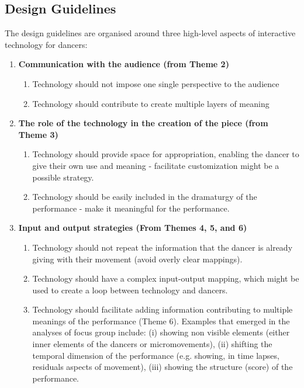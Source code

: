 \subsection{Design Guidelines}

The design guidelines are organised around three high-level aspects of interactive technology for dancers:

\renewcommand{\labelitemi}{$\alph$}
\renewcommand{\labelitemii}{$\alph$}
\begin{enumerate}

\item \textbf{Communication with the audience  (from Theme 2)}
\begin{enumerate}
\item Technology should not impose one single perspective to the audience
\item Technology should contribute to create multiple layers of meaning
\end{enumerate}

\item \textbf{The role of the technology in the creation of the piece (from Theme 3)}
\begin{enumerate}
\item Technology should provide space for appropriation, enabling the dancer to give their own use and meaning - facilitate customization might be a possible strategy.
\item Technology should be easily included in the dramaturgy of the performance - make it meaningful for the
performance.
\end{enumerate}

\item \textbf{Input and output strategies (From Themes 4, 5, and 6)}
\begin{enumerate}
\item Technology should not repeat the information that the dancer is already giving with their movement (avoid overly clear mappings).
\item Technology should have a complex input-output mapping, which might be used to create a loop between technology and dancers.
\item Technology should facilitate adding information contributing to multiple meanings of the performance (Theme 6). Examples that emerged in the analyses of focus group include: (i) showing non visible elements (either inner elements of the dancers or micromovements), (ii) shifting the temporal dimension of the performance (e.g. showing, in time lapses, residuals aspects of movement), (iii) showing the structure (score) of the performance.
\end{enumerate}

\end{enumerate}


